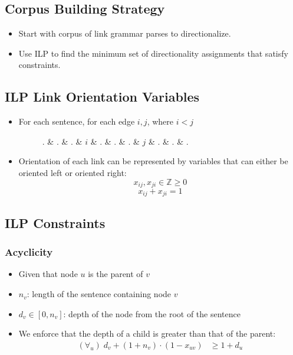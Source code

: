 \documentclass[a0,landscape]{a0poster}
\begin{document}
\begin{multicols}{4}
\subsection*{Corpus Building Strategy}
\begin{itemize}
\item Start with corpus of link grammar parses to directionalize. 
\item Use ILP to find the minimum set of directionality assignments that satisfy constraints.
\end{itemize}

\subsection*{ILP Link Orientation Variables}
\begin{itemize}
\item[] For each sentence, for each edge $i,j$, where $i < j$
\begin{figure}[H]
  \centering
  \begin{dependency}[edge style={-}]
    \begin{deptext}
      . \& . \& . \& $i$ \& . \& . \& . \& $j$ \& . \& . \& . \\
    \end{deptext}
  \end{dependency}
\end{figure}
\item[] Orientation of each link can be represented by variables that can either be oriented left or oriented right:
$$x_{ij}, x_{ji} \in \mathbb{Z} \geq 0$$
$$x_{ij} + x_{ji} = 1$$
\end{itemize}


\vspace{-2cm}
\subsection*{ILP Constraints}
\subsubsection*{Acyclicity}

\begin{itemize}
\item[] Given that node $u$ is the parent of $v$
\item[] $n_v$: length of the sentence containing node $v$
\item[] $d_v \in [0, n_v]$: depth of the node from the root of the sentence
\item[] We enforce that the depth of a child is greater than that of the parent:
\begin{align}
  (\forall_u)\; d_v + (1 + n_v) \cdot (1 - x_{uv}) & \geq 1+d_u
\end{align}
\end{itemize}


\end{multicols}
\end{document}
